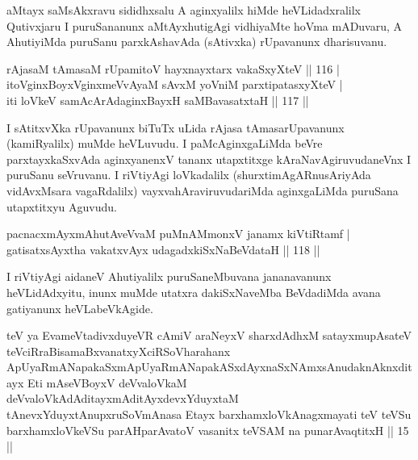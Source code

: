 \begin{artha}
aMtayx saMsAkxravu sididhxsalu A aginxyalilx hiMde heVLidadxralilx
Qutivxjaru I puruSananunx aMtAyxhutigAgi vidhiyaMte hoVma mADuvaru, A
AhutiyiMda puruSanu parxkAshavAda (sAtivxka) rUpavanunx dharisuvanu.
\end{artha}

\begin{shl}
rAjasaM tAmasaM rUpamitoV hayxnayxtarx vakaSxyXteV \hfill|| 116 | \\
itoV\s ginxBoyxV\s ginxmeVvAyaM sAvxM yoVniM parxtipatasxyXteV | \\
iti loVkeV samAcArAdaginxBayxH saMBavasatxtaH \hfill|| 117 || 
\end{shl}

\begin{artha}
I sAtitxvXka rUpavanunx biTuTx uLida rAjasa tAmasarUpavanunx
(kamiRyalilx) muMde heVLuvudu. I paMcAginxgaLiMda beVre
parxtayxkaSxvAda aginxyanenxV tananx utapxtitxge kAraNavAgiruvudaneVnx I
puruSanu seVruvanu. I riVtiyAgi loVkadalilx (shurxtimAgARnusAriyAda
vidAvxMsara vagaRdalilx) vayxvahAraviruvudariMda aginxgaLiMda puruSana
utapxtitxyu Aguvudu.
\end{artha}


\begin{shl}
pacnacxmAyxmAhutAveVvaM puMnAMmonxV janamx kiVtiRtamf | \\
gatisatxsAyxtha vakatxvAyx udagadxkiSxNaBeVdataH \hfill|| 118 || 
\end{shl}

\begin{artha}
I riVtiyAgi aidaneV Ahutiyalilx puruSaneMbuvana jananavanunx\break
heVLidAdxyitu, inunx muMde utatxra dakiSxNaveMba BeVdadiMda avana
gatiyanunx heVLabeVkAgide.
\end{artha}

\begin{kandikeshl}
teV ya EvameVtadivxduyeVR cAmiV araNeyxV sharxdAdhxM satayxmupAsateV teV\s ciRraBisamaBxvanatxyXciRSoV\s harahanx ApUyaRmANapakaSxmA\-\break pUyaRmANapakASxdAyxnaSxNAmxsAnudaknAknxditayx Eti mAseVBoyxV deVvaloVkaM deVvaloVkAdAditayxmAditAyxdevxYduyxtaM tAnevxYduyxtAnupxruSoV\break mAnasa Etayx barxhamxloVkAnagxmayati teV teVSu barxhamxloVkeVSu parAH\break parAvatoV vasanitx teVSAM na punarAvaqtitxH || 15 ||
\end{kandikeshl}


